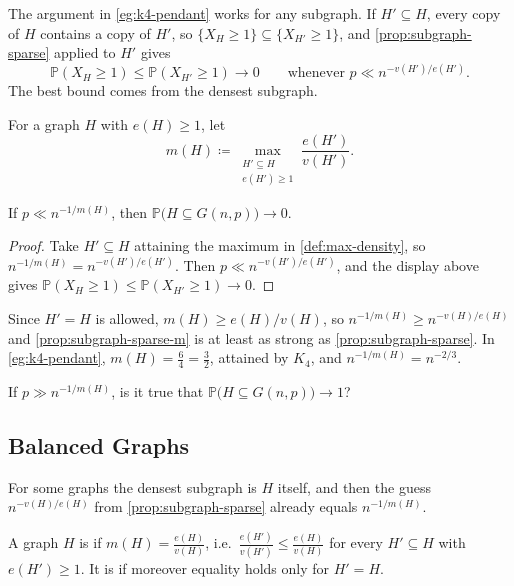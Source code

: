 The argument in \autoref{eg:k4-pendant} works for any subgraph. If \(H' \subseteq H\), every copy of \(H\) contains a copy of \(H'\), so \(\{X_H \ge 1\} \subseteq \{X_{H'} \ge 1\}\), and \autoref{prop:subgraph-sparse} applied to \(H'\) gives
\[
    \mathbb{P}(X_H \ge 1) \le \mathbb{P}(X_{H'} \ge 1) \to 0
    \qquad\text{whenever } p \ll n^{-v(H')/e(H')}.
\]
The best bound comes from the densest subgraph.

\begin{definition}\label{def:max-density}
    For a graph \(H\) with \(e(H) \ge 1\), let
    \[
        m(H) \coloneqq \max_{\substack{H' \subseteq H \\ e(H') \ge 1}} \frac{e(H')}{v(H')} .
    \]
\end{definition}

\begin{proposition}\label{prop:subgraph-sparse-m}
    If \(p \ll n^{-1/m(H)}\), then \(\mathbb{P}\bigl( H \subseteq G(n,p) \bigr) \to 0\).
\end{proposition}

\begin{proof}
    Take \(H' \subseteq H\) attaining the maximum in \autoref{def:max-density}, so \(n^{-1/m(H)} = n^{-v(H')/e(H')}\). Then \(p \ll n^{-v(H')/e(H')}\), and the display above gives \(\mathbb{P}(X_H \ge 1) \le \mathbb{P}(X_{H'} \ge 1) \to 0\).
\end{proof}

Since \(H' = H\) is allowed, \(m(H) \ge e(H)/v(H)\), so \(n^{-1/m(H)} \ge n^{-v(H)/e(H)}\) and \autoref{prop:subgraph-sparse-m} is at least as strong as \autoref{prop:subgraph-sparse}. In \autoref{eg:k4-pendant}, \(m(H) = \frac{6}{4} = \frac{3}{2}\), attained by \(K_4\), and \(n^{-1/m(H)} = n^{-2/3}\).

\begin{question}\label{q:subgraph-converse}
    If \(p \gg n^{-1/m(H)}\), is it true that \(\mathbb{P}\bigl( H \subseteq G(n,p) \bigr) \to 1\)?
\end{question}

\subsection{Balanced Graphs}

For some graphs the densest subgraph is \(H\) itself, and then the guess \(n^{-v(H)/e(H)}\) from \autoref{prop:subgraph-sparse} already equals \(n^{-1/m(H)}\).

\begin{definition}[Balanced]\label{def:balanced}
    A graph \(H\) is  if \(m(H) = \frac{e(H)}{v(H)}\), i.e.\ \(\frac{e(H')}{v(H')} \le \frac{e(H)}{v(H)}\) for every \(H' \subseteq H\) with \(e(H') \ge 1\). It is  if moreover equality holds only for \(H' = H\).
\end{definition}

